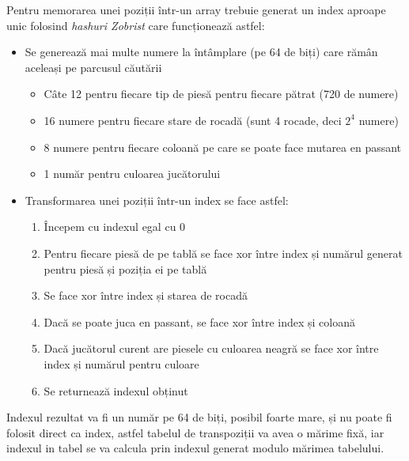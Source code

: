 Pentru memorarea unei poziții într-un array trebuie generat un index aproape unic folosind
\textit{hashuri Zobrist} care funcționează astfel:
\begin{itemize}
	\item Se generează mai multe numere la întâmplare (pe 64 de biți) care rămân aceleași
	      pe parcusul căutării
	      \begin{itemize}
		      \item Câte 12 pentru fiecare tip de piesă pentru fiecare pătrat (720 de numere)
		      \item 16 numere pentru fiecare stare de rocadă (sunt 4 rocade, deci $2^4$ numere)
		      \item 8 numere pentru fiecare coloană pe care se poate face mutarea en passant
		      \item 1 număr pentru culoarea jucătorului
	      \end{itemize}

	\item Transformarea unei poziții într-un index se face astfel:
	      \begin{enumerate}
		      \item Începem cu indexul egal cu 0
		      \item Pentru fiecare piesă de pe tablă se face xor între index și numărul generat
		            pentru piesă și poziția ei pe tablă
		      \item Se face xor între index și starea de rocadă
		      \item Dacă se poate juca en passant, se face xor între index și coloană
		      \item Dacă jucătorul curent are piesele cu culoarea neagră se face xor între index
		            și numărul pentru culoare
		      \item Se returnează indexul obținut
	      \end{enumerate}
\end{itemize}

Indexul rezultat va fi un număr pe 64 de biți, posibil foarte mare, și nu poate fi folosit
direct ca index, astfel tabelul de transpoziții va avea o mărime fixă, iar indexul in tabel
se va calcula prin indexul generat modulo mărimea tabelului.
